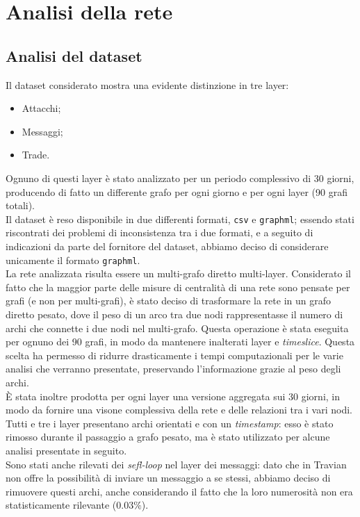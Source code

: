 \chapter{Analisi della rete}
\section{Analisi del dataset}
Il dataset considerato mostra una evidente distinzione in tre layer:
\begin{itemize}
	\item Attacchi;
	\item Messaggi;
	\item Trade.
\end{itemize}
Ognuno di questi layer è stato analizzato per un periodo complessivo di 30 giorni, producendo di fatto un differente grafo per ogni giorno e per ogni layer (90 grafi totali).\\
Il dataset è reso disponibile in due differenti formati, \texttt{csv} e \texttt{graphml}; essendo stati riscontrati dei problemi di inconsistenza tra i due formati, e a seguito di indicazioni da parte del fornitore del dataset, abbiamo deciso di considerare unicamente il formato \texttt{graphml}.\\
La rete analizzata risulta essere un multi-grafo diretto multi-layer. Considerato il fatto che la maggior parte delle misure di centralità di una rete sono pensate per grafi (e non per multi-grafi), è stato deciso di trasformare la rete in un grafo diretto pesato, dove il peso di un arco tra due nodi rappresentasse il numero di archi che connette i due nodi nel multi-grafo. Questa operazione è stata eseguita per ognuno dei 90 grafi, in modo da mantenere inalterati layer e \textit{timeslice}. Questa scelta ha permesso di ridurre drasticamente i tempi computazionali per le varie analisi che verranno presentate, preservando l'informazione grazie al peso degli archi.\\
È stata inoltre prodotta per ogni layer una versione aggregata sui 30 giorni, in modo da fornire una visone complessiva della rete e delle relazioni tra i vari nodi.
Tutti e tre i layer presentano archi orientati e con un \textit{timestamp}: esso è stato rimosso durante il passaggio a grafo pesato, ma è stato utilizzato per alcune analisi presentate in seguito.\\
Sono stati anche rilevati dei \textit{sefl-loop} nel layer dei messaggi: dato che in Travian non offre la possibilità di inviare un messaggio a se stessi, abbiamo deciso di rimuovere questi archi, anche considerando il fatto che la loro numerosità non era statisticamente rilevante ($0.03\%$).

